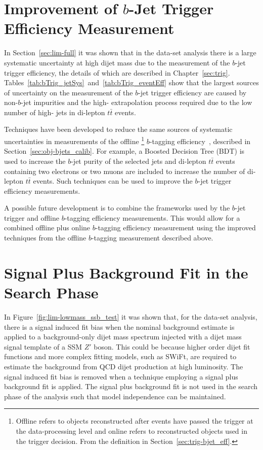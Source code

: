 \section{Improvement of $b$-Jet Trigger Efficiency Measurement}

In Section~\ref{sec:lim-full} it was shown that in the \lm{} data-set analysis there
is a large systematic uncertainty at high dijet mass due to the 
measurement of the $b$-jet trigger efficiency, the details of which are described in Chapter~\ref{sec:trig}.
Tables~\ref{tab:bTrig_jetSys}~and~\ref{tab:bTrig_eventEff} show that the largest sources of uncertainty
on the measurement of the $b$-jet trigger efficiency are caused by non-$b$-jet impurities
and the high-\pT{} extrapolation process required due to the low number of high-\pT{} jets in di-lepton $t\bar{t}$ events.

Techniques have been developed to reduce the same sources of systematic uncertainties in
measurements of the offline \footnote{Offline refers to objects reconstructed after events have passed the trigger at the data-processing level
  and online refers to reconstructed objects used in the trigger decision.
  From the definition in Section~\ref{sec:trig-bjet_eff}.}
$b$-tagging efficiency~\cite{obj-bjets_calib_tech,obj-bjets_calib_plots}, described in Section~\ref{sec:obj-bjets_calib}.
For example, a Boosted Decision Tree (BDT) is used to increase the $b$-jet purity of the selected jets
and di-lepton $t\bar{t}$ events containing two electrons or two muons are included to increase the number of di-lepton $t\bar{t}$ events.
Such techniques can be used to improve the $b$-jet trigger efficiency measurements.

A possible future development is to combine the frameworks used by the
$b$-jet trigger and offline $b$-tagging efficiency measurements.
This would allow for a combined offline plus online $b$-tagging efficiency measurement using
the improved techniques from the offline $b$-tagging measurement described above.

\section{Signal Plus Background Fit in the Search Phase}

In Figure~\ref{fig:lim-lowmass_ssb_test} it was shown that, for the \lm{} data-set analysis,
there is a signal induced fit bias when the nominal background estimate is applied to a
background-only dijet mass spectrum injected with a dijet mass signal template of a SSM $Z'$ boson.
This could be because higher order dijet fit functions
and more complex fitting models, such as SWiFt, are required to estimate the background from QCD dijet production at high luminosity.
The signal induced fit bias is removed when a technique employing a signal plus background fit is applied.
The signal plus background fit is not used in the search phase of the \lm{} analysis such that model independence can be maintained.

